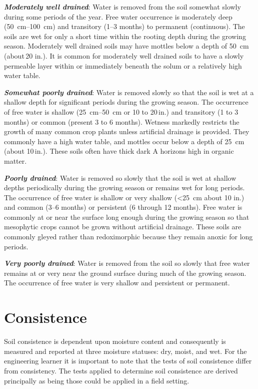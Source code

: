 \documentclass{book}
\begin{document}
\textbf{\textit{Moderately well drained}}: Water is removed from the soil somewhat slowly during some periods of the year. Free water occurrence is moderately deep (\qtyrange{50}{100}{cm}) and transitory (\numrange{1}{3} months) to permanent (continuous). The soils are wet for only a short time within the rooting depth during the growing season. Moderately well drained soils may have mottles below a depth of \qty{50}{cm} (about\,20 in.). It is common for moderately well drained soils to have a slowly permeable layer within or immediately beneath the solum or a relatively high water table.

\textbf{\textit{Somewhat poorly drained}}: Water is removed slowly so that the soil is wet at a shallow depth for significant periods during the growing season. The occurrence of free water is shallow (\qtyrange{25}{50}{cm} or 10 to 20\,in.) and transitory (1 to 3 months) or common (present 3 to 6 months). Wetness markedly restricts the growth of many common crop plants unless artificial drainage is provided. They commonly have a high water table, and mottles occur below a depth of \qty{25}{cm} (about 10\,in.). These soils often have thick dark A horizons high in organic matter.

\textbf{\textit{Poorly drained}}: Water is removed so slowly that the soil is wet at shallow depths periodically during the growing season or remains wet for long periods. The occurrence of free water is shallow or very shallow (\textless{}\qty{25}{cm} about 10 in.) and common (\numrange{3}{6} months) or persistent (6 through 12 months). Free water is commonly at or near the surface long enough during the growing season so that mesophytic crops cannot be grown without artificial drainage. These soils are commonly gleyed rather than redoximorphic  because they remain anoxic for long periods.

\textbf{\textit{Very poorly drained}}: Water is removed from the soil so slowly that free water remains at or very near the ground surface during much of the growing season. The occurrence of free water is very shallow and persistent or permanent.

\section{Consistence}
\label{consistence}

Soil consistence is dependent upon moisture content and consequently is measured and reported at three moisture statuses: dry, moist, and wet. For the engineering learner it is important to note that the tests of soil consistence differ from consistency. The tests applied to determine soil consistence are derived principally as being those could be applied in a field setting.
\end{document}
